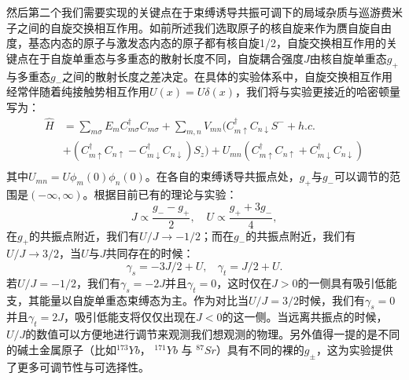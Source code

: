 然后第二个我们需要实现的关键点在于束缚诱导共振可调下的局域杂质与巡游费米子之间的自旋交换相互作用\cite{ono2019antiferromagnetic,zhang2016kondo,cheng2017enhancing,zhang2018control,ji2018confinement,zhang2020tight}。如前所述我们选取原子的核自旋来作为赝自旋自由度，基态内态的原子与激发态内态的原子都有核自旋1/2，自旋交换相互作用的关键点在于自旋单重态与多重态的散射长度不同，自旋耦合强度$J$由核自旋单重态$g_+$与多重态$g_-$之间的散射长度之差决定\cite{scazza2014observation,cappellini2014direct,ono2019antiferromagnetic}。在具体的实验体系中，自旋交换相互作用经常伴随着纯接触势相互作用$U(x)=U\delta(x)$，我们将与实验更接近的哈密顿量写为：
\begin{equation}
\begin{split}
     \hat{H} &= \sum_{m\sigma}E_m C_{m\sigma}^\dagger C_{m\sigma} + \sum_{m,n} V_{mn} ( C_{m\uparrow}^\dagger  C_{n\downarrow} S^- + h.c. \\
     & +   (C_{m\uparrow}^\dagger  C_{n\uparrow}-C_{m\downarrow}^\dagger  C_{n\downarrow}) S_z )+U_{mn} (C_{m\uparrow}^\dagger  C_{n\uparrow}+C_{m\downarrow}^\dagger  C_{n\downarrow})\\
\end{split}  \label{H_U}
\end{equation}
其中$U_{mn}=U\phi_m(0)\phi_n(0)$。在各自的束缚诱导共振点处，$g_+$与$g_-$可以调节的范围是$(-\infty,\infty)$。根据目前已有的理论与实验：
\begin{equation}
J \propto \frac{g_- -g_+}{2} ,\quad U \propto \frac{g_++3g_-}{4},
\end{equation}
在$g_+$的共振点附近，我们有$U/J\to-1/2$；而在$g_-$的共振点附近，我们有$U/J\to3/2$，当$U$与$J$共同存在的时候：
\begin{equation} 
\gamma_s=-3J/2+U,\ \ \ \ \gamma_t=J/2+U. \label{eff_gamma}
\end{equation}
若$U/J=-1/2$，我们有$\gamma_s=-2J$并且$\gamma_t=0$，这时仅在$J>0$的一侧具有吸引低能支，其能量以自旋单重态束缚态为主。作为对比当$U/J=3/2$时候，我们有$\gamma_s=0$并且$\gamma_t=2J$，吸引低能支将仅仅出现在$J<0$的这一侧。当远离共振点的时候，$U/J$的数值可以方便地进行调节来观测我们想观测的物理。另外值得一提的是不同的碱土金属原子（比如${}^{173}Yb$， ${}^{171}Yb$ 与 ${}^{87}Sr$）具有不同的裸的$g_{\pm}$，这为实验提供了更多可调节性与可选择性。


